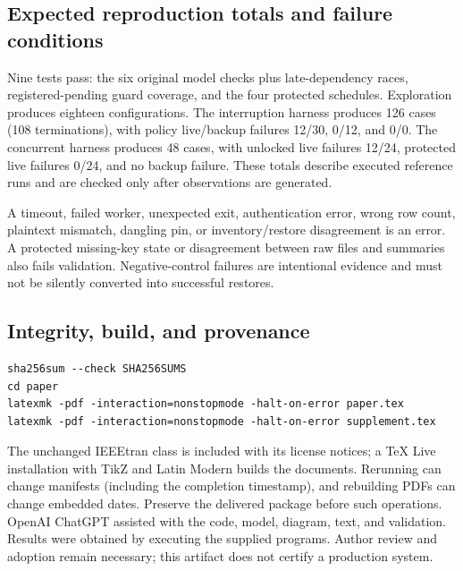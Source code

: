 \documentclass[10pt]{article}
\begin{document}
\subsection*{Expected reproduction totals and failure conditions}
Nine tests pass: the six original model checks plus late-dependency races,
registered-pending guard coverage, and the four protected schedules. Exploration
produces eighteen configurations. The interruption harness produces 126 cases
(108 terminations), with policy live/backup failures 12/30, 0/12, and 0/0.
The concurrent harness produces 48 cases, with unlocked live failures 12/24,
protected live failures 0/24, and no backup failure. These totals describe
executed reference runs and are checked only after observations are generated.

A timeout, failed worker, unexpected exit, authentication error, wrong row count,
plaintext mismatch, dangling pin, or inventory/restore disagreement is an error.
A protected missing-key state or disagreement between raw files and summaries
also fails validation. Negative-control failures are intentional evidence and
must not be silently converted into successful restores.

\subsection*{Integrity, build, and provenance}
\begin{Verbatim}[fontsize=\small]
sha256sum --check SHA256SUMS
cd paper
latexmk -pdf -interaction=nonstopmode -halt-on-error paper.tex
latexmk -pdf -interaction=nonstopmode -halt-on-error supplement.tex
\end{Verbatim}
The unchanged IEEEtran class is included with its license notices; a TeX Live
installation with TikZ and Latin Modern builds the documents. Rerunning can
change manifests (including the completion timestamp), and rebuilding PDFs can
change embedded dates. Preserve the delivered package before such operations.
OpenAI ChatGPT assisted with the code, model, diagram, text, and validation.
Results were obtained by executing the supplied programs. Author review and
adoption remain necessary; this artifact does not certify a production system.
\end{document}
